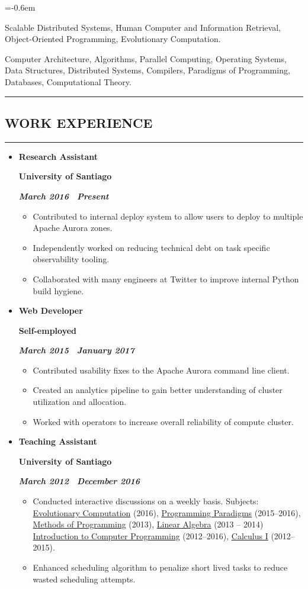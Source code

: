 \documentclass[10pt,letterpaper]{article}
\newcommand{\textbox}[1]{
  \parbox{.333\textwidth}{#1}
}
\newcommand{\sectionTitle}[1]{
  \hrule
  \vspace{-1.0em} 
  \subsection*{\uppercase{\textbf{#1}}}
  \vspace{-0.3em}
    \hrule
    \vspace{0.5em}  
}
\newcommand{\titleExperienceWithoutLocation}[4]{
  \vspace{1.0em}
  \item[]
  {
    \textbox{\textbf{#1}\hfill}\textbox{\hfil \textbf{#2}\hfil}\hfill \textbf{\emph{#3 \textendash \ #4}}
  }
}
\begin{document}
  \begin{description}[labelindent=\parindent]
    \parskip=-0.6em
    \item [Graduate Coursework:] Scalable Distributed Systems, Human Computer and Information Retrieval, Object-Oriented Programming, Evolutionary Computation.
    \item [Undergraduated Coursework:] Computer Architecture, Algorithms, Parallel Computing, Operating Systems, Data Structures, Distributed Systems, Compilers, Paradigms of Programming, Databases, Computational Theory.
  \end{description}
  
  \sectionTitle{Work Experience}
  \begin{itemize}[leftmargin=*]
    \parskip=-0.6em
    \titleExperienceWithoutLocation{Research Assistant}{University of Santiago}{March 2016}{Present}
      \begin{itemize}[label=\textbullet]
        \itemsep0em
        \item Contributed to internal deploy system to allow users to deploy to multiple Apache Aurora zones.
        \item Independently worked on reducing technical debt on task specific observability tooling.
        \item Collaborated with many engineers at Twitter to improve internal Python build hygiene.
      \end{itemize}

    \titleExperienceWithoutLocation{Web Developer}{Self-employed}{March 2015}{January 2017}
      \begin{itemize}[label=\textbullet]
        \itemsep0em
        \item Contributed usability fixes to the Apache Aurora command line client.
        \item Created an analytics pipeline to gain better understanding of cluster utilization and allocation.
        \item Worked with operators to increase overall reliability of compute cluster.
      \end{itemize}
    
    \titleExperienceWithoutLocation{Teaching Assistant}{University of Santiago}{March 2012}{December 2016}
      \begin{itemize}[label=\textbullet]
        \itemsep0em
        \item Conducted interactive discussions on a weekly basis. Subjects: \underline{Evolutionary Computation} (2016), \underline{Programming Paradigms} (2015–2016), \underline{Methods of Programming} (2013), \underline{Linear Algebra} (2013 – 2014) \underline{Introduction to Computer Programming} (2012–2016), \underline{Calculus I} (2012–2015).
        \item Enhanced scheduling algorithm to penalize short lived tasks to reduce wasted scheduling attempts.
      \end{itemize}
    

\end{itemize}
\end{document}
